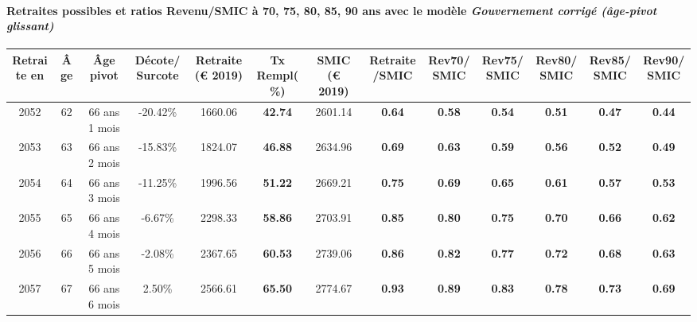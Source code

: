 \paragraph{Retraites possibles et ratios Revenu/SMIC à 70, 75, 80, 85, 90 ans avec le modèle \emph{Gouvernement corrigé (âge-pivot glissant)}}  
 
{ \scriptsize \begin{center} 
\begin{tabular}[htb]{|c|c||c|c||c|c||c||c|c|c|c|c|c|} 
\hline 
 Retraite en &  Âge &  Âge pivot &  Décote/Surcote &  Retraite (\euro{} 2019) &  Tx Rempl(\%) &  SMIC (\euro{} 2019) &  Retraite/SMIC &  Rev70/SMIC &  Rev75/SMIC &  Rev80/SMIC &  Rev85/SMIC &  Rev90/SMIC \\ 
\hline \hline 
 2052 &  62 &  66 ans 1 mois &  -20.42\% &  1660.06 &  {\bf 42.74} &  2601.14 &  {\bf {\color{red} 0.64}} &  {\bf {\color{red} 0.58}} &  {\bf {\color{red} 0.54}} &  {\bf {\color{red} 0.51}} &  {\bf {\color{red} 0.47}} &  {\bf {\color{red} 0.44}} \\ 
\hline 
 2053 &  63 &  66 ans 2 mois &  -15.83\% &  1824.07 &  {\bf 46.88} &  2634.96 &  {\bf {\color{red} 0.69}} &  {\bf {\color{red} 0.63}} &  {\bf {\color{red} 0.59}} &  {\bf {\color{red} 0.56}} &  {\bf {\color{red} 0.52}} &  {\bf {\color{red} 0.49}} \\ 
\hline 
 2054 &  64 &  66 ans 3 mois &  -11.25\% &  1996.56 &  {\bf 51.22} &  2669.21 &  {\bf {\color{red} 0.75}} &  {\bf {\color{red} 0.69}} &  {\bf {\color{red} 0.65}} &  {\bf {\color{red} 0.61}} &  {\bf {\color{red} 0.57}} &  {\bf {\color{red} 0.53}} \\ 
\hline 
 2055 &  65 &  66 ans 4 mois &  -6.67\% &  2298.33 &  {\bf 58.86} &  2703.91 &  {\bf {\color{red} 0.85}} &  {\bf {\color{red} 0.80}} &  {\bf {\color{red} 0.75}} &  {\bf {\color{red} 0.70}} &  {\bf {\color{red} 0.66}} &  {\bf {\color{red} 0.62}} \\ 
\hline 
 2056 &  66 &  66 ans 5 mois &  -2.08\% &  2367.65 &  {\bf 60.53} &  2739.06 &  {\bf {\color{red} 0.86}} &  {\bf {\color{red} 0.82}} &  {\bf {\color{red} 0.77}} &  {\bf {\color{red} 0.72}} &  {\bf {\color{red} 0.68}} &  {\bf {\color{red} 0.63}} \\ 
\hline 
 2057 &  67 &  66 ans 6 mois &  2.50\% &  2566.61 &  {\bf 65.50} &  2774.67 &  {\bf {\color{red} 0.93}} &  {\bf {\color{red} 0.89}} &  {\bf {\color{red} 0.83}} &  {\bf {\color{red} 0.78}} &  {\bf {\color{red} 0.73}} &  {\bf {\color{red} 0.69}} \\ 
\hline 
\hline 
\end{tabular} 
\end{center} } 
